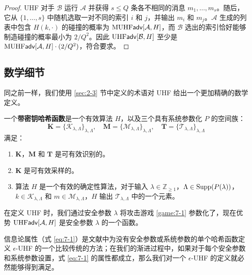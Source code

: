 \begin{proof}
UHF 对手 $\mathcal{B}$ 运行 $\mathcal{A}$ 并获得 $s\leq Q$ 条各不相同的消息 $m_1,\dots,m_s$。随后，它从 $\{1,\dots,s\}$ 中随机选取一对不同的索引 $i$ 和 $j$，并输出 $m_i$ 和 $m_j$。$\mathcal{A}$ 生成的列表中包含 $H(k,\cdot)$ 的碰撞的概率为 ${\rm MUHF}\mathsf{adv}[\mathcal{A},H]$，而 $\mathcal{B}$ 选出的索引恰好能够制造碰撞的概率最小为 $2/Q^2$。因此 ${\rm UHF}\mathsf{adv}[\mathcal{B},H]$ 至少是 ${\rm MUHF}\mathsf{adv}[\mathcal{A},H]\cdot{(2/Q^2)}$，符合要求。
\end{proof}

\subsection{数学细节}\label{subsec:7-1-2}

同之前一样，我们使用 \ref{sec:2-3} 节中定义的术语对 UHF 给出一个更加精确的数学定义。

\begin{definition}[带密钥哈希函数]\label{def:7-4}
一个\textbf{带密钥哈希函数}是一个有效算法 $H$，以及三个具有系统参数化 $P$ 的空间族：
\[
\mathbf{K}=\{\mathcal{K}_{\lambda,\Lambda}\}_{\lambda,\Lambda},\quad
\mathbf{M}=\{\mathcal{M}_{\lambda,\Lambda}\}_{\lambda,\Lambda},\quad
\mathbf{T}=\{\mathcal{T}_{\lambda,\Lambda}\}_{\lambda,\Lambda}
\]
满足：
\begin{enumerate}
	\item $\mathbf{K}$，$\mathbf{M}$ 和 $\mathbf{T}$ 是可有效识别的。
	\item $\mathbf{K}$ 是可有效采样的。
	\item 算法 $H$ 是一个有效的确定性算法，对于输入 $\lambda\in\mathbb{Z}_{\geq1}$，$\Lambda\in{\rm Supp}(P(\lambda))$，$k\in\mathcal{K}_{\lambda,\Lambda}$ 和 $m\in\mathcal{M}_{\lambda,\Lambda}$，$H$ 输出 $\mathcal{T}_{\lambda,\Lambda}$ 中的一个元素。
\end{enumerate}
\end{definition}

在定义 UHF 时，我们通过安全参数 $\lambda$ 将攻击游戏 \ref{game:7-1} 参数化了，现在优势 ${\rm UHF}\mathsf{adv}[\mathcal{A},H]$ 是安全参数 $\lambda$ 的一个函数。

信息论属性（式 \ref{eq:7-1}）是文献中为没有安全参数或系统参数的单个哈希函数定义 $\epsilon$-UHF 的一个比较传统的方法；在我们的渐进过程中，如果对于每个安全参数和系统参数设置，式 \ref{eq:7-1} 的属性都成立，那么我们对一个 $\epsilon$-UHF 的定义就必然能够得到满足。